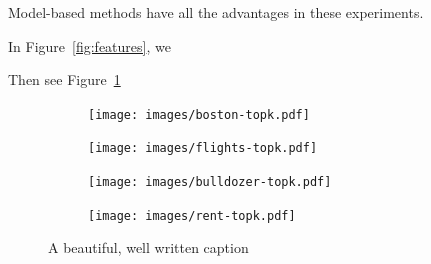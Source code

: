 \documentclass[12pt]{article}
\newcommand{\figref}[1]{Figure~\ref{#1}}
\begin{document}
Model-based methods have all the advantages in these experiments.

In \figref{fig:features}, we

Then see \figref{fig:topk}

\begin{figure}[b]
\centering
\begin{subfigure}{.5\textwidth}
    \centering
\texttt{[image: images/boston-topk.pdf]}
\vspace{-2mm}\vspace{3mm}
\end{subfigure}%
\begin{subfigure}{.5\textwidth}
    \centering
\texttt{[image: images/flights-topk.pdf]}
\vspace{-2mm}\vspace{3mm}
\end{subfigure}
\begin{subfigure}{.5\textwidth}
    \centering
\texttt{[image: images/bulldozer-topk.pdf]}
\vspace{-2mm}\vspace{3mm}
\end{subfigure}%
\begin{subfigure}{.5\textwidth}
    \centering
\texttt{[image: images/rent-topk.pdf]}
\vspace{-2mm}\vspace{3mm}
\end{subfigure}
\caption[short]{A beautiful, well written caption}
\label{fig:topk}
\end{figure}
\end{document}
